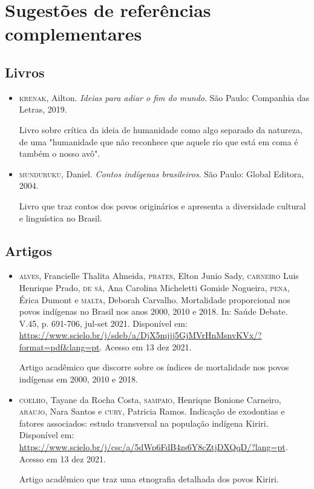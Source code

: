\documentclass[11pt]{extarticle}
\begin{document}
\section{Sugestões de referências complementares}

\subsection{Livros} 

\begin{itemize}
\item \textsc{krenak}, Ailton. \textit{Ideias para adiar o fim do mundo}. São Paulo: Companhia das Letras, 2019.

Livro sobre crítica da ideia de humanidade como algo separado da natureza, de uma "humanidade que não reconhece que aquele rio que está em coma é também o nosso avô".

\item \textsc{munduruku}, Daniel. \textit{Contos indígenas brasileiros}. São Paulo: Global Editora, 2004.

Livro que traz contos dos povos originários e apresenta a diversidade cultural e linguística no Brasil.
\end{itemize}

\subsection{Artigos}

\begin{itemize}
\item \textsc{alves}, Francielle Thalita Almeida, \textsc{prates}, Elton Junio Sady, \textsc{carneiro} Luis Henrique Prado, \textsc{de sá}, Ana Carolina Micheletti Gomide Nogueira, \textsc{pena}, Érica Dumont e \textsc{malta}, Deborah Carvalho. Mortalidade proporcional nos povos indígenas no Brasil nos anos 2000, 2010 e 2018. 
In: Saúde Debate. V.45, p. 691-706, jul-set 2021. Disponível em: \url{https://www.scielo.br/j/sdeb/a/DjX5mjjj5GjMVrHnMsnvKVx/?format=pdf&lang=pt}. 
Acesso em 13 dez 2021. 

Artigo acadêmico que discorre sobre os índices de mortalidade nos povos indígenas em 2000, 2010 e 2018. 

\item \textsc{coelho}, Tayane da Rocha Costa, \textsc{sampaio}, Henrique Bonione Carneiro, \textsc{araujo}, Nara Santos e \textsc{cury}, Patricia Ramos. Indicação de exodontias e fatores associados: estudo transversal na população indígena Kiriri. Disponível em: \url{https://www.scielo.br/j/csc/a/5dWp6FdB4zs6Y8cZtjDXQqD/?lang=pt}. Acesso em 13 dez 2021. 

Artigo acadêmico que traz uma etnografia detalhada dos povos Kiriri.  
\end{itemize}
\end{document}
